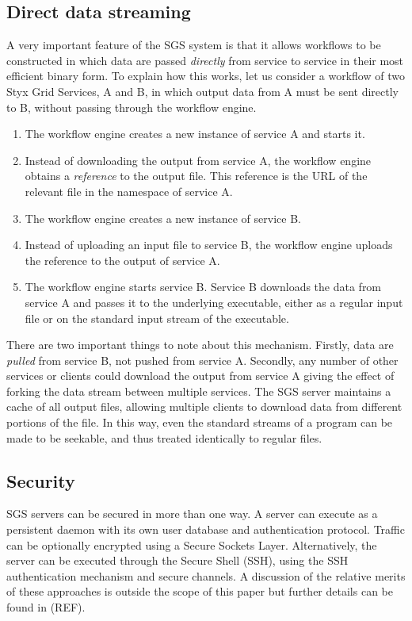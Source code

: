 \documentclass[a4paper]{article}
\begin{document}
\subsection{Direct data streaming}\label{sec:datapassing}
A very important feature of the SGS system is that it allows workflows to be constructed in which data are passed \textit{directly} from service to service in their most efficient binary form.  To explain how this works, let us consider a workflow of two Styx Grid Services, A and B, in which output data from A must be sent directly to B, without passing through the workflow engine.

\begin{enumerate}
\item The workflow engine creates a new instance of service A and starts it.
\item Instead of downloading the output from service A, the workflow engine obtains a \textit{reference} to the output file.  This reference is the URL of the relevant file in the namespace of service A.
\item The workflow engine creates a new instance of service B.
\item Instead of uploading an input file to service B, the workflow engine uploads the reference to the output of service A.
\item The workflow engine starts service B.  Service B downloads the data from service A and passes it to the underlying executable, either as a regular input file or on the standard input stream of the executable.
\end{enumerate}

There are two important things to note about this mechanism.  Firstly, data are \textit{pulled} from service B, not pushed from service A.  Secondly, any number of other services or clients could download the output from service A giving the effect of forking the data stream between multiple services.  The SGS server maintains a cache of all output files, allowing multiple clients to download data from different portions of the file.  In this way, even the standard streams of a program can be made to be seekable, and thus treated identically to regular files.

\subsection{Security}
SGS servers can be secured in more than one way.  A server can execute as a persistent daemon with its own user database and authentication protocol.  Traffic can be optionally encrypted using a Secure Sockets Layer.  Alternatively, the server can be executed through the Secure Shell (SSH), using the SSH authentication mechanism and secure channels.  A discussion of the relative merits of these approaches is outside the scope of this paper but further details can be found in (REF).
\end{document}
